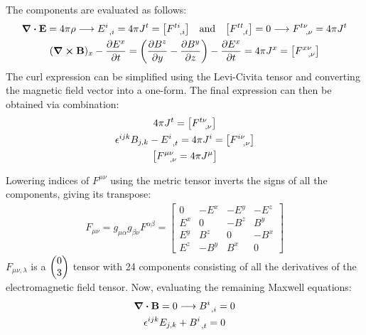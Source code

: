 \documentclass{report}
\begin{document}
\begin{subquests}
\begin{subquests}
		\item		
		The components are evaluated as follows:
		\begin{gather*}
			\div{{\vb E}} = 4\pi\rho \longrightarrow E^i_{\;\;,i} = 4\pi J^t = \bqty{F^{ti}_{\;\;\;,i}} \qq{and} \bqty{F^{tt}_{\;\;\;,t}} = 0 \longrightarrow F^{t\nu}_{\;\;\;,\nu} = 4\pi J^t \\
			(\curl{{\vb B}})_x - \pdv{E^x}{t} = \pqty{\pdv{B^z}{y} - \pdv{B^y}{z}} - \pdv{E^x}{t} = 4\pi J^x = \bqty{F^{x\nu}_{\;\;\;,\nu}}
		\end{gather*}
		The curl expression can be simplified using the Levi-Civita tensor and converting the magnetic field vector into a one-form. The final expression can then be obtained via combination:
		\begin{gather*}
			4\pi J^t = \bqty{F^{t\nu}_{\;\;\;,\nu}} \\
			\epsilon^{ijk}B_{j,k} - E^i_{\;\;,t} = 4\pi J^i = \bqty{F^{i\nu}_{\;\;\;,\nu}} \\
			\bqty{F^{\mu\nu}_{\;\;\;,\nu} = 4\pi J^{\mu}}
		\end{gather*}
		
		\item		
		Lowering indices of $F^{\mu\nu}$ using the metric tensor inverts the signs of all the components, giving its transpose:
		\begin{gather*}
			F_{\mu\nu} = g_{\mu\alpha}g_{\beta\nu} F^{\alpha\beta} =
			\begin{bmatrix}
				0 & -E^x & -E^y & -E^z \\
				E^x & 0 & -B^z & B^y \\
				E^y & B^z & 0 & -B^x \\
				E^z & -B^y & B^x & 0
			\end{bmatrix}
		\end{gather*}
		$F_{\mu\nu,\lambda}$ is a $\pmqty{0 \\ 3}$ tensor with 24 components consisting of all the derivatives of the electromagnetic field tensor. Now, evaluating the remaining Maxwell equations:
		\begin{gather*}
			\div{{\vb B}} = 0 \longrightarrow B^i_{\;\;,i} = 0 \\
			\epsilon^{ijk} E_{j,k} + B^i_{\;\;,t} = 0
		\end{gather*}

		\item

		\item

		\item

		\item
	\end{subquests}
\end{subquests}
\end{document}
